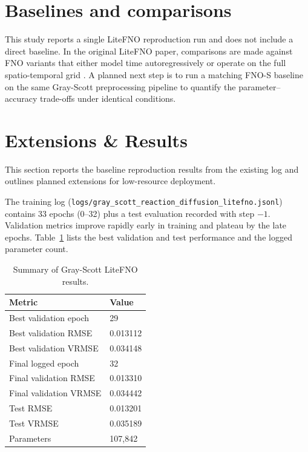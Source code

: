 \documentclass[11pt]{article}
\begin{document}
\section{Baselines and comparisons}
This study reports a single LiteFNO reproduction run and does not include a
direct baseline. In the original LiteFNO paper, comparisons are made against
FNO variants that either model time autoregressively or operate on the full
spatio-temporal grid \cite{litefno2025}. A planned next step is to run a
matching FNO-S baseline on the same Gray-Scott preprocessing pipeline to
quantify the parameter--accuracy trade-offs under identical conditions.

\section{Extensions \& Results}
This section reports the baseline reproduction results from the existing log
and outlines planned extensions for low-resource deployment.

The training log (\texttt{logs/gray\_scott\_reaction\_diffusion\_litefno.jsonl})
contains 33 epochs (0--32) plus a test evaluation recorded with step \(-1\).
Validation metrics improve rapidly early in training and plateau by the late
epochs. Table~\ref{tab:results} lists the best validation and test performance
and the logged parameter count.

\begin{table}[t]
  \centering
  \caption{Summary of Gray-Scott LiteFNO results.}
  \label{tab:results}
  \begin{tabular}{ll}
    \toprule
    Metric & Value \\
    \midrule
    Best validation epoch & 29 \\
    Best validation RMSE & \num{0.013112} \\
    Best validation VRMSE & \num{0.034148} \\
    Final logged epoch & 32 \\
    Final validation RMSE & \num{0.013310} \\
    Final validation VRMSE & \num{0.034442} \\
    Test RMSE & \num{0.013201} \\
    Test VRMSE & \num{0.035189} \\
    Parameters & 107,842 \\
    \bottomrule
  \end{tabular}
\end{table}
\end{document}
